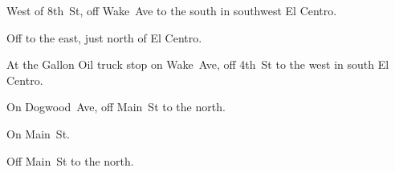 
\begin{LocationList}

West of 8th~St, off Wake~Ave to the south in southwest El Centro.

Off  to the east, just north of El Centro.

At the Gallon Oil truck stop on Wake~Ave, off  4th~St to the west in south El Centro.

On Dogwood~Ave, off  Main~St to the north.

On  Main~St.

Off  Main~St to the north.

\end{LocationList}
